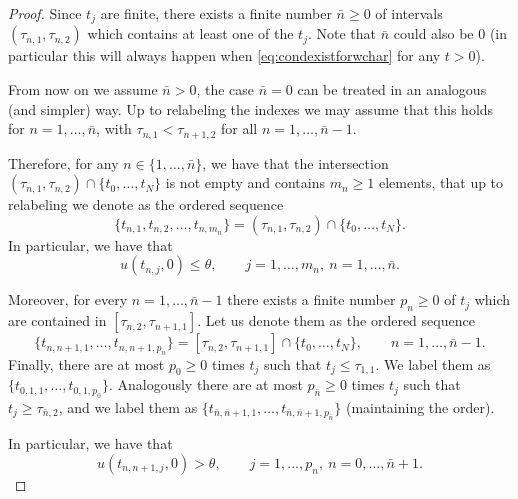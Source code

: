 \documentclass[a4paper, 10pt, final]{article}
\begin{document}
\begin{proof}
  Since $t_j$ are  finite, there exists a finite number $\bar n\geq 0$ of intervals $(\tau_{n,1}, \tau_{n,2})$ which contains at least one of the $t_j$. Note that $\bar n$ could also be $0$ (in particular this will always happen when \eqref{eq:condexistforwchar} for any $t>0$). 

  From now on we assume $\bar n>0$, the case $\bar n=0$ can be treated in an analogous (and simpler) way. 
  Up to relabeling the indexes we may assume that this holds for $n=1,\dots, \bar n$, with $\tau_{n,1}<\tau_{n+1, 2}$ for all $n=1, \dots, \bar n-1$.



  Therefore, for any $n\in \{1, \dots, \bar n\}$, we have that  the intersection 
  $ (\tau_{n,1}, \tau_{n,2})\cap\{t_0, \dots, t_N\}$ is not empty and contains $m_n\geq 1$ elements, that up to relabeling we denote as the ordered sequence  \[\{t_{n,1}, t_{n, 2}, \dots, t_{n, m_{n}}\}=(\tau_{n,1}, \tau_{n,2})\cap\{t_0, \dots, t_N\}.\]
  In particular, we have that
  \[u(t_{n, j}, 0)\leq\theta,\qquad  j=1,\dots, m_n,\ n=1,\dots, \bar n.\]

  Moreover, for every $n=1, \dots,\bar n-1$
  there exists a finite number $p_n\geq 0$ of $t_j$ which are contained in $[\tau_{n, 2}, \tau_{n+1, 1}]$. 
  Let us denote them as the ordered sequence 
  \begin{equation*}
    \{t_{n,n+1,1},  \dots, t_{n, n+1,p_{n}}\}=[\tau_{n,2}, \tau_{n+1,1}]\cap\{t_0, \dots, t_N\},\qquad n=1, \dots, \bar n-1.    
  \end{equation*}
  Finally, there are at most $p_0\geq 0$ times $t_j$ such that $t_{j}\leq \tau_{1,1}$. We label them as $\{t_{0,1, 1},\dots, t_{0,1,p_0}\}$. Analogously there are  at most $p_{\bar n}\geq 0$ times $t_j$ such that $t_{j}\geq \tau_{\bar n,2}$, and we label them as $\{t_{\bar n,\bar n+1, 1},\dots, t_{\bar n,\bar n+1,p_{\bar n}}\}$ (maintaining the order). 

  In particular, we have that
  \[u(t_{n,n+1, j}, 0)>\theta, \qquad j=1,\dots, p_n, \ n=0, \dots, \bar n+1.\]


\end{proof}
\end{document}
